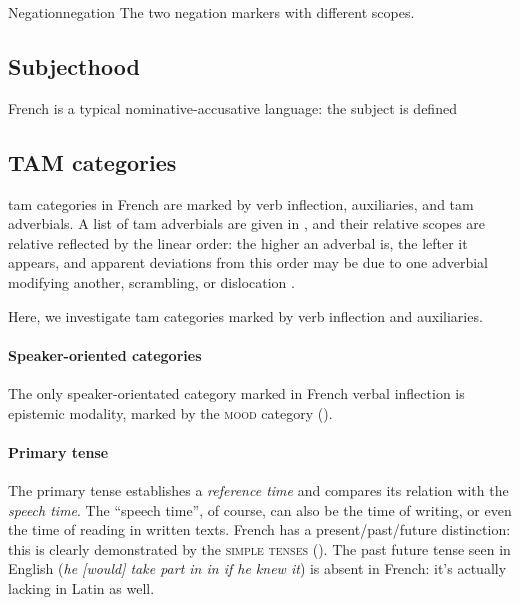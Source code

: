 \documentclass[a4paper, oneside, 12pt]{report}
\newcommand*{\citepage}[1]{p.~{#1}}
\newcommand*{\citepages}[1]{pp.~{#1}}
\newcommand{\form}[1]{\emph{#1}}
\newcommand*{\category}[1]{\textsc{#1}}
\begin{document}
\begin{todobox}{Negation}{negation}
    The two negation markers with different scopes.
\end{todobox}



\subsection{Subjecthood}\label{sec:grammatical.clause.subject}

French is a typical nominative-accusative language:
the subject is defined 

\subsection{TAM categories}\label{sec:grammatical.clause.tam}
\ac{tam} categories in French are marked by verb inflection, auxiliaries,
and \ac{tam} adverbials.
A list of \ac{tam} adverbials are given in \citet[\citepage{103, (3)}]{rowlett2007syntax},
and their relative scopes are relative reflected by the linear order:
the higher an adverbal is, the lefter it appears,
and apparent deviations from this order may be due to 
one adverbial modifying another,
scrambling, or dislocation \citep[\citepages{104-105}]{rowlett2007syntax}.

Here, we investigate \ac{tam} categories marked by verb inflection and auxiliaries.

\paragraph*{Speaker-oriented categories} 
The only speaker-orientated category marked in French verbal inflection is epistemic modality,
marked by the \category{mood} category
().

\paragraph*{Primary tense}
The primary tense establishes a \emph{reference time}
and compares its relation with the \emph{speech time}.
The ``speech time'', of course, can also be the time of writing,
or even the time of reading in written texts. 
French has a present/past/future distinction:
this is clearly demonstrated by the \category{simple tenses}
(). 
The past future tense seen in English (\form{he [would] take part in in if he knew it})
is absent in French: it's actually lacking in Latin as well.
\end{document}
